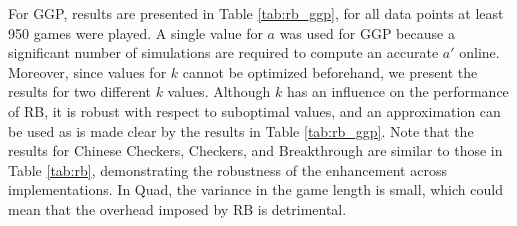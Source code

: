 \documentclass{ecai2014}
\begin{document}
For GGP, results are presented in Table \ref{tab:rb_ggp}, for all data points at least 950 games were played. A single value for $a$ was used for GGP because a significant number of simulations are required to compute an accurate $a'$ online. Moreover, since values for $k$ cannot be optimized beforehand, we present the results for two different $k$ values. Although $k$ has an influence on the performance of RB, it is robust with respect to suboptimal values, and an approximation can be used as is made clear by the results in Table \ref{tab:rb_ggp}. Note that the results for Chinese Checkers, Checkers, and Breakthrough are similar to those in Table \ref{tab:rb}, demonstrating the robustness of the enhancement across implementations. In Quad, the variance in the game length is small, which could mean that the overhead imposed by RB is detrimental.

\begin{table}
{\caption{Qualitative Bonus using different search times, 5000 games} \label{tab:qb}}
\tabcolsep=0.15cm
\centering
{}
\end{table}
\end{document}
